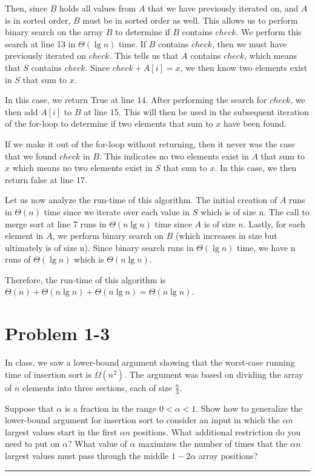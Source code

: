 \documentclass[11pt]{article}
\def\separateline{\medskip\hrule\medskip}
\begin{document}
Then, since $B$ holds all values from $A$ that we have previously iterated on, and $A$ is in sorted order, $B$ must be in sorted order as well. This allows us to perform binary search on the array $B$ to determine if $B$ contains $check$. We perform this search at line 13 in $\Theta(\lg{n})$ time. If $B$ contains $check$, then we must have previously iterated on $check$. This tells us that $A$ contains $check$, which means that $S$ contains $check$. Since $check + A[i] = x$, we then know two elements exist in $S$ that sum to $x$.

In this case, we return True at line 14. After performing the search for $check$, we then add $A[i]$ to $B$ at line 15. This will then be used in the subsequent iteration of the for-loop to determine if two elements that sum to $x$ have been found.

If we make it out of the for-loop without returning, then it never was the case that we found $check$ in $B$. This indicates no two elements exist in $A$ that sum to $x$ which means no two elements exist in $S$ that sum to $x$. In this case, we then return false at line 17.

Let us now analyze the run-time of this algorithm. The initial creation of $A$ runs in $\Theta(n)$ time since we iterate over each value in $S$ which is of size n. The call to merge sort at line 7 runs in $\Theta(n\lg{n})$ time since $A$ is of size $n$. Lastly, for each element in $A$, we perform binary search on $B$ (which increases in size but ultimately is of size n). Since binary search runs in $\Theta(\lg{n})$ time, we have n runs of $\Theta(\lg{n})$ which is $\Theta(n\lg{n})$.

Therefore, the run-time of this algorithm is $\Theta(n) + \Theta(n\lg{n}) + \Theta(n\lg{n}) = \Theta(n\lg{n})$.


\newpage

\section{Problem 1-3}
In class, we saw a lower-bound argument showing that the worst-case running time of insertion sort is $\Omega(n^2)$. The argument was based on dividing the array of $n$ elements into three sections, each of size $\frac{n}{3}$.

Suppose that $\alpha$ is a fraction in the range $0 < \alpha < 1$. Show how to generalize the lower-bound argument for insertion sort to consider an input in which the $\alpha n$ largest values start in the first $\alpha n$ positions. What additional restriction do you need to put on $\alpha$? What value of $\alpha$ maximizes the number of times that the $\alpha n$ largest values must pass through the middle $1 - 2\alpha$ array positions?
\separateline
\end{document}
